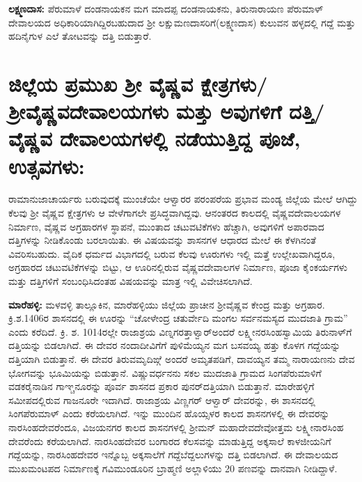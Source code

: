 \textbf{ಲಕ್ಷ್ಮಣದಾಸ:} ಪೆರುಮಾಳೆ ದಂಡನಾಯಕನ ಮಗ ಮಾದಪ್ಪ ದಂಡನಾಯಕನು, ತಿರುನಾರಾಯಣ ಪೆರುಮಾಳ್​ ದೇವಾಲಯದ ಅಧಿಕಾರಿಯಾಗಿದ್ದಿರಬಹುದಾದ ಶ‍್ರೀ ಲಕ್ಷುಮಣದಾಸರಿಗೆ(ಲಕ್ಷ್ಮಣದಾಸ) ಕುಲುವನ ಹಳ್ಳದಲ್ಲಿ ಗದ್ದೆ ಮತ್ತು ಹದಿನೈಗುಳ ಎಲೆ ತೋಟವನ್ನು ದತ್ತಿ ಬಿಡುತ್ತಾರೆ.


\section*{ಜಿಲ್ಲೆಯ ಪ್ರಮುಖ ಶ‍್ರೀ ವೈಷ್ಣವ ಕ್ಷೇತ್ರಗಳು/ ಶ‍್ರೀವೈಷ್ಣವದೇವಾಲಯಗಳು ಮತ್ತು ಅವುಗಳಿಗೆ ದತ್ತಿ/ವೈಷ್ಣವ ದೇವಾಲಯಗಳಲ್ಲಿ ನಡೆಯುತ್ತಿದ್ದ ಪೂಜೆ, ಉತ್ಸವಗಳು:}

ರಾಮಾನುಜಾಚಾರ್ಯರು ಬರುವುದಕ್ಕೆ ಮುಂಚೆಯೇ ಆಳ್ವಾರರ ಪರಂಪರೆಯ ಪ್ರಭಾವ ಮಂಡ್ಯ ಜಿಲ್ಲೆಯ ಮೇಲೆ ಆಗಿದ್ದು ಕೆಲವು ಶ‍್ರೀ ವೈಷ್ಣವ ಕ್ಷೇತ್ರಗಳು ಆ ವೇಳೆಗಾಗಲೇ ಪ್ರಸಿದ್ಧವಾಗಿದ್ದವು. ಆನಂತರದ ಕಾಲದಲ್ಲಿ ವೈಷ್ಣವದೇವಾಲಯಗಳ ನಿರ್ಮಾಣ, ವೈಷ್ಣವ ಅಗ್ರಹಾರಗಳ ಸ್ಥಾಪನೆ, ಮುಂತಾದ ಚಟುವಟಿಕೆಗಳು ಹೆಚ್ಚಾಗಿ, ಅವುಗಳಿಗೆ ಅಪಾರವಾದ ದತ್ತಿಗಳನ್ನು ನೀಡಿಕೊಂಡು ಬರಲಾಯಿತು. ಈ ವಿಷಯವನ್ನು ಶಾಸನಗಳ ಆಧಾರದ ಮೇಲೆ ಈ ಕೆಳಗಿನಂತೆ ವಿವರಿಸಬಹುದು. ವೈದಿಕ ಧರ್ಮದ ವಿಭಾಗದಲ್ಲಿ ಬರುವ ಕೆಲವು ಊರುಗಳು ಇಲ್ಲಿ ಮತ್ತೆ ಉಲ್ಲೇಖವಾಗಿದ್ದರೂ, ಅಗ್ರಹಾರದ ಚಟುವಟಿಕೆಗಳನ್ನು ಬಿಟ್ಟು, ಆ ಊರಿನಲ್ಲಿರುವ ವೈಷ್ಣವದೇವಾಲಗಳ ನಿರ್ಮಾಣ, ಪೂಜಾ ಕೈಂಕರ್ಯಗಳು ಮತ್ತು ದತ್ತಿಗಳಿಗೆ ಸಂಬಂಧಿಸಿದಂತಹ ವಿಷಯವನ್ನು ಮಾತ್ರ ಇಲ್ಲಿ ವಿವೇಚಿಸಲಾಗಿದೆ.

\textbf{ಮಾರೆಹಳ್ಳಿ:} ಮಳವಳ್ಳಿ ತಾಲ್ಲೂಕಿನ, ಮಾರೆಹಳ್ಳಿಯು ಜಿಲ್ಲೆಯ ಪ್ರಾಚೀನ ಶ‍್ರೀವೈಷ್ಣವ ಕೇಂದ್ರ ಮತ್ತು ಅಗ್ರಹಾರ. ಕ್ರಿ.ಶ.1406ರ ಶಾಸನದಲ್ಲಿ ಈ ಊರನ್ನು “ಚೋಳೇಂದ್ರ ಚತುರ್ವೇದಿ ಮಂಗಲ ಸರ್ವನಮಸ್ಯದ ಮುದಜಾತಿ ಗ್ರಾಮ” ಎಂದು ಕರೆದಿದೆ. ಕ್ರಿ. ಶ. 1014ರಲ್ಲೇ ರಾಜಾಶ್ರಯ ವಿಣ್ನಗರತ್ತಾಳ್ವಾರ್​ ಅಂದರೆ ಲಕ್ಷ್ಮೀನರಸಿಂಹಸ್ವಾಮಿಯ ತಿರುನಾಳ್​ಗೆ ದತ್ತಿಯನ್ನು ಬಿಡಲಾಗಿದೆ. ಈ ದೇವರ ನಂದಾದೀವಿಗೆಗೆ ಪುಳಿಮೆಯ್ಯನ ಮಗ ಬಸವಯ್ಯ ಹತ್ತು ಕೊಳಗ ಗದ್ದೆಯನ್ನು ದತ್ತಿಯಾಗಿ ಬಿಡುತ್ತಾನೆ. ಈ ದೇವರ ತಿರುವಮೃದಿಙ್ಗೆ ಅಂದರೆ ಅಮೃತಪಡಿಗೆ, ದಾವಯ್ಯನ ತಮ್ಮ ನಾರಾಯಣನು ದೇವ ಭೋಗವನ್ನು ಭೂಮಿಯನ್ನು ಬಿಡುತ್ತಾನೆ. ವಿಷ್ಣುವರ್ಧನನು ಸಕಲ ಮುದಜಾತಿ ಗ್ರಾಮದ ಸಿಂಗಪೆರುಮಾಳಿಗೆ ವಡಕರೈನಾಡಿನ ಗಾಞ್ಚನೂರನ್ನು ಪೂರ್ವ ಶಾಸನದ ಪ್ರಕಾರ ಪುನರ್​ದತ್ತಿಯಾಗಿ ಬಿಡುತ್ತಾನೆ. ಮಾರೇಹಳ್ಳಿಗೆ ಸಮೀಪದಲ್ಲಿರುವ ಗಾಜನೂರೇ ಇದಾಗಿದೆ. ರಾಜಾಶ್ರಯ ವಿಣ್ಣಗರ್​ ಆಳ್ವಾರ್​ ದೇವರನ್ನು, ಈ ಶಾಸನದಲ್ಲಿ ಸಿಂಗಪೆರುಮಾಳ್​ ಎಂದು ಕರೆಯಲಾಗಿದೆ. ಇನ್ನು ಮುಂದಿನ ಹೊಯ್ಸಳರ ಕಾಲದ ಶಾಸನಗಳಲ್ಲಿ ಈ ದೇವರನ್ನು ನಾರಸಿಂಹದೇವರೆಂದೂ, ವಿಜಯನಗರ ಕಾಲದ ಶಾಸನಗಳಲ್ಲಿ ಶ‍್ರೀಮನ್​ ಮಹಾದೇವದೇವೋತ್ತಮ ಲಕ್ಷ್ಮೀನಾರಸಿಂಹ ದೇವರೆಂದು ಕರೆಯಲಾಗಿದೆ. ನಾರಸಿಂಹದೇವರ ಬಂಗಾರದ ಕೆಲಸವನ್ನು ಮಾಡುತ್ತಿದ್ದ ಅಕ್ಕಸಾಲೆ ಕಾಳಜೀಯನಿಗೆ ಗದ್ದೆಯನ್ನು, ನಾರಸಿಂಹದೇವರ ಇನ್ನೊಬ್ಬ ಅಕ್ಕಸಾಲೆಗೆ ಗದ್ದೆಬೆದ್ದಲುಗಳನ್ನು ದತ್ತಿ ಬಿಡಲಾಗಿದೆ. ಈ ದೇವಾಲಯದ ಮುಖಮಂಟಪದ ನಿರ್ಮಾಣಕ್ಕೆ ಗವಿಮುಂಡೂರಿನ ಬ್ರಾಹ್ಮಣಿ ಅಲ್ಲಾಳಿಯು 20 ಪಣವನ್ನು ದಾನವಾಗಿ ನೀಡಿದ್ದಾಳೆ.

